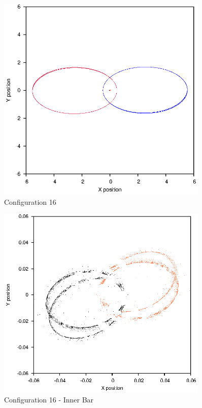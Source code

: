 \documentclass[a4paper,12pt]{article}
\begin{document}
\begin{figure}[H]
\centering
\includegraphics[width=0.9\textwidth]{./results/06-95-06-15/Orbit.eps}
\caption{Configuration 16}
\label{fig:config16}
\end{figure}
\begin{figure}[H]
\centering
\includegraphics[width=0.9\textwidth]{./results/06-95-06-15/Inner.eps}
\caption{Configuration 16 - Inner Bar}
\label{fig:config16i}
\end{figure}
\end{document}
